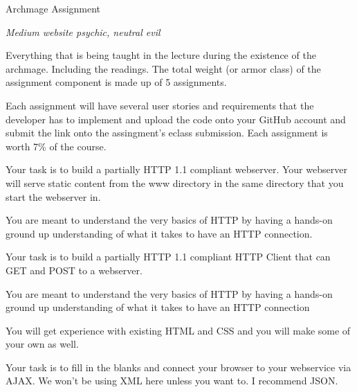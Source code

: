 \documentclass[../CMPUT-404-Notes.tex]{subfiles}
\begin{document}
\begin{monsterbox}{Archmage Assignment}
    \begin{hangingpar}
        \textit{Medium website psychic, neutral evil}
    \end{hangingpar}
    \dndline
    \basics[
        armorclass = 35,
        hitpoints = 35,
        speed = {Varies}
    ]
    \dndline
    \stats[
        STR = \stat{10},
        DEX = \stat{14},
        CON = \stat{12},
        INT = \stat{20},
        WIS = \stat{15},
        CHA = \stat{16},
    ]
    \dndline
    \details[
        languages = {Python, HTML, CSS, JavaScript},
        challenge = {12},
    ]
    \dndline
    Everything that is being taught in the lecture during the existence of the archmage. Including the readings.
    The total weight (or armor class) of the assignment component is made up of 5 assignments.   

    Each assignment will have several user stories and requirements that the developer has to implement and upload the code onto your GitHub account and submit the link onto the assingment's eclass submission. Each assignment is worth 7\% of the course.
    \begin{monsteraction}
        Your task is to build a partially HTTP 1.1 compliant webserver. Your webserver will serve static content from the www directory in the same directory that you start the webserver in.

        You are meant to understand the very basics of HTTP by having a hands-on ground up understanding of what it takes to have an HTTP connection.
    \end{monsteraction}
    \begin{monsteraction}
        Your task is to build a partially HTTP 1.1 compliant HTTP Client that can GET and POST to a webserver.

        You are meant to understand the very basics of HTTP by having a hands-on ground up understanding of what it takes to have an HTTP connection
    \end{monsteraction}
    \begin{monsteraction}
        You will get experience with existing HTML and CSS and you will make some of your own as well.
    \end{monsteraction}
    \begin{monsteraction}
        Your task is to fill in the blanks and connect your browser to your webservice via AJAX. We won’t be using XML here unless you want to. I recommend JSON.


\end{monsteraction}
\end{monsterbox}
\end{document}
